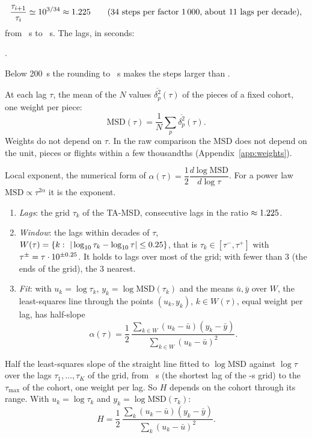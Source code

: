 \documentclass[10pt,a4paper]{article}
\begin{document}
\begin{description}[leftmargin=0pt, itemsep=7pt]
  \[ \frac{\tau_{i+1}}{\tau_i}\simeq10^{3/34}\approx1.225 \qquad\text{(34{} steps per factor 1\,000, about 11{}
     lags per decade)}, \]
  from \LagMin~s to \LagMax~s. The \LagCount{} lags, in seconds:
  \begin{center}\small
  \LagList.
  \end{center}
  Below 200~s the rounding to \GridS~s makes the steps larger than \LagRatio.
\item[MSD] At each lag $\tau$, the mean of the $N$ values $\overline{\delta^2_p}(\tau)$ of the pieces of a
  fixed cohort, one weight per piece:
  \[ \mathrm{MSD}(\tau) = \frac{1}{N}\sum_{p}\overline{\delta^2_p}(\tau). \]
  Weights do not depend on $\tau$. In the raw comparison the MSD does not depend on the unit, pieces or
  flights within a few thousandths (Appendix~\ref{app:weights}).
\item[$\boldsymbol{\alpha(\tau)}$] Local exponent, the numerical form of
  $\alpha(\tau)=\dfrac{1}{2}\dfrac{d\log\mathrm{MSD}}{d\log\tau}$. For a power law $\mathrm{MSD}\propto\tau^{2\alpha}$
  it is the exponent.
  \begin{enumerate}
  \item \emph{Lags}: the grid $\tau_k$ of the TA-MSD, consecutive lags in the ratio $\approx1.225$.
  \item \emph{Window}: the lags within \HalfDecade{} decades of $\tau$,
    $W(\tau)=\{k:\ |\log_{10}\tau_k-\log_{10}\tau|\le\HalfDecade\}$, that is $\tau_k\in[\tau^-,\tau^+]$ with
    $\tau^\pm=\tau\cdot10^{\pm0.25}$. It holds \WindowLagsMin{} to \WindowLagsMax{} lags over most of the grid; with fewer than 3 (the
    ends of the grid), the 3 nearest.
  \item \emph{Fit}: with $u_k=\log\tau_k$, $y_k=\log\mathrm{MSD}(\tau_k)$ and the means $\bar u,\bar y$ over $W$,
    the least-squares line through the points $(u_k,y_k)$, $k\in W(\tau)$, equal weight per lag, has half-slope
    \[ \alpha(\tau) = \frac{1}{2}\,\frac{\sum_{k\in W}(u_k-\bar u)(y_k-\bar y)}{\sum_{k\in W}(u_k-\bar u)^2}. \]
  \end{enumerate}

\item[$\boldsymbol{H}$] Half the least-squares slope of the straight line fitted to $\log\mathrm{MSD}$ against
  $\log\tau$ over the lags $\tau_1,\dots,\tau_K$ of the grid, from \LagMin~s (the shortest lag of the \GridS-s grid) to
  the $\tau_\mathrm{max}$ of the cohort, one weight per lag. So $H$ depends on the cohort through its range. With $u_k=\log\tau_k$ and
  $y_k=\log\mathrm{MSD}(\tau_k)$:
  \[ H = \frac{1}{2}\,\frac{\sum_k (u_k-\bar u)(y_k-\bar y)}{\sum_k (u_k-\bar u)^2}. \]


\end{description}
\end{document}
